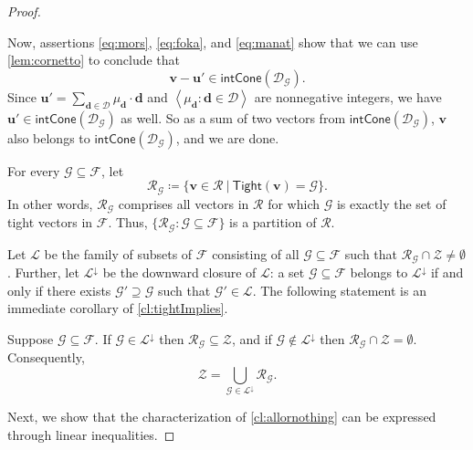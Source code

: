 \documentclass{theoretics}
\newcommand{\Dd}{\mathcal{D}}
\newcommand{\tup}[1]{{\mathbf{#1}}}
\newcommand{\dd}{\tup d}
\newcommand{\uu}{\tup u}
\newcommand{\myvv}{\tup v} %
\newcommand{\mset}[1]{\left\langle #1\right\rangle}
\newcommand{\Ff}{\mathcal{F}}
\newcommand{\Gg}{\mathcal{G}}
\newcommand{\Rr}{\mathcal{R}}
\newcommand{\Zz}{\mathcal{Z}}
\newcommand{\Ss}{\mathscr{L}}
\newcommand{\Tight}{\mathsf{Tight}}
\newcommand{\intcone}{\mathsf{intCone}}
\begin{document}
\begin{proof}
\begin{subproof}
 Now, assertions \cref{eq:mors}, \cref{eq:foka}, and \cref{eq:manat} show that we can use \cref{lem:cornetto} to conclude that
 $$\myvv-\uu'\in \intcone(\Dd_\Gg).$$
 Since $\uu'=\sum_{\dd\in \Dd} \mu_\dd\cdot \dd$ and $\mset{\mu_\dd\colon \dd\in \Dd}$ are nonnegative integers, we have $\uu'\in \intcone(\Dd_\Gg)$ as well. So as a sum of two vectors from $\intcone(\Dd_\Gg)$, $\myvv$ also belongs to $\intcone(\Dd_\Gg)$, and we are done.
\end{subproof}

For every $\Gg\subseteq \Ff$, let
$$\Rr_\Gg\coloneqq \{\myvv\in \Rr~|~\Tight(\myvv)=\Gg\}.$$
In other words, $\Rr_\Gg$ comprises all vectors in $\Rr$ for which $\Gg$ is exactly the set of tight vectors in $\Ff$. Thus, $\{\Rr_\Gg\colon \Gg\subseteq \Ff\}$ is a partition of $\Rr$.

Let $\Ss$ be the family of subsets of $\Ff$ consisting of all $\Gg\subseteq \Ff$ such that $\Rr_\Gg\cap \Zz\neq \emptyset$. Further, let $\Ss^{\downarrow}$ be the downward closure of $\Ss$: a set $\Gg\subseteq \Ff$ belongs to $\Ss^\downarrow$ if and only if there exists $\Gg'\supseteq \Gg$ such that $\Gg'\in \Ss$.
The following statement is an immediate corollary of \cref{cl:tightImplies}.

\begin{techclaim}\label{cl:allornothing}
Suppose $\Gg\subseteq \Ff$. If $\Gg\in \Ss^{\downarrow}$ then $\Rr_\Gg\subseteq \Zz$, and if $\Gg\notin \Ss^{\downarrow}$ then $\Rr_\Gg\cap \Zz=\emptyset$. Consequently,
$$\Zz=\bigcup_{\Gg\in \Ss^\downarrow} \Rr_\Gg.$$
\end{techclaim}

Next, we show that the characterization of \cref{cl:allornothing} can be expressed through linear inequalities.


\end{proof}
\end{document}

